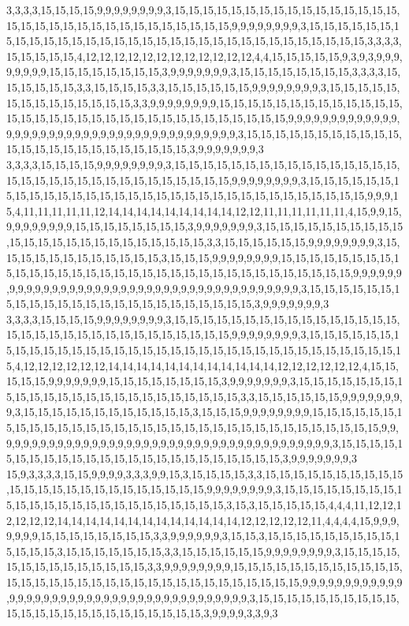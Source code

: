 3,3,3,3,15,15,15,15,9,9,9,9,9,9,9,9,3,15,15,15,15,15,15,15,15,15,15,15,15,15,15,15,15,15,15,15,15,15,15,15,15,15,15,15,15,15,15,15,15,9,9,9,9,9,9,9,9,3,15,15,15,15,15,15,15,15,15,15,15,15,15,15,15,15,15,15,15,15,15,15,15,15,15,15,15,15,15,15,15,15,3,3,3,3,15,15,15,15,15,4,12,12,12,12,12,12,12,12,12,12,12,12,4,4,15,15,15,15,15,9,3,9,3,9,9,9,9,9,9,9,9,15,15,15,15,15,15,15,15,3,9,9,9,9,9,9,9,3,15,15,15,15,15,15,15,15,3,3,3,3,15,15,15,15,15,15,3,3,15,15,15,15,3,3,15,15,15,15,15,15,9,9,9,9,9,9,9,9,3,15,15,15,15,15,15,15,15,15,15,15,15,15,15,3,3,9,9,9,9,9,9,9,9,15,15,15,15,15,15,15,15,15,15,15,15,15,15,15,15,15,15,15,15,15,15,15,15,15,15,15,15,15,15,15,15,15,9,9,9,9,9,9,9,9,9,9,9,9,9,9,9,9,9,9,9,9,9,9,9,9,9,9,9,9,9,9,9,9,9,9,9,9,9,9,9,9,3,15,15,15,15,15,15,15,15,15,15,15,15,15,15,15,15,15,15,15,15,15,15,15,15,3,9,9,9,9,9,9,9,3
3,3,3,3,15,15,15,15,9,9,9,9,9,9,9,9,3,15,15,15,15,15,15,15,15,15,15,15,15,15,15,15,15,15,15,15,15,15,15,15,15,15,15,15,15,15,15,15,15,9,9,9,9,9,9,9,9,3,15,15,15,15,15,15,15,15,15,15,15,15,15,15,15,15,15,15,15,15,15,15,15,15,15,15,15,15,15,15,15,15,9,9,9,15,4,11,11,11,11,11,12,14,14,14,14,14,14,14,14,14,12,12,11,11,11,11,11,11,4,15,9,9,15,9,9,9,9,9,9,9,9,15,15,15,15,15,15,15,15,3,9,9,9,9,9,9,9,3,15,15,15,15,15,15,15,15,15,15,15,15,15,15,15,15,15,15,15,15,15,15,15,15,3,3,15,15,15,15,15,15,9,9,9,9,9,9,9,9,3,15,15,15,15,15,15,15,15,15,15,15,15,3,15,15,15,9,9,9,9,9,9,9,9,15,15,15,15,15,15,15,15,15,15,15,15,15,15,15,15,15,15,15,15,15,15,15,15,15,15,15,15,15,15,15,15,15,9,9,9,9,9,9,9,9,9,9,9,9,9,9,9,9,9,9,9,9,9,9,9,9,9,9,9,9,9,9,9,9,9,9,9,9,9,9,9,9,3,15,15,15,15,15,15,15,15,15,15,15,15,15,15,15,15,15,15,15,15,15,15,15,15,3,9,9,9,9,9,9,9,3
3,3,3,3,15,15,15,15,9,9,9,9,9,9,9,9,3,15,15,15,15,15,15,15,15,15,15,15,15,15,15,15,15,15,15,15,15,15,15,15,15,15,15,15,15,15,15,15,15,9,9,9,9,9,9,9,9,3,15,15,15,15,15,15,15,15,15,15,15,15,15,15,15,15,15,15,15,15,15,15,15,15,15,15,15,15,15,15,15,15,15,15,15,4,12,12,12,12,12,12,14,14,14,14,14,14,14,14,14,14,14,14,12,12,12,12,12,12,4,15,15,15,15,15,9,9,9,9,9,9,9,15,15,15,15,15,15,15,15,3,9,9,9,9,9,9,9,3,15,15,15,15,15,15,15,15,15,15,15,15,15,15,15,15,15,15,15,15,15,15,15,15,3,3,15,15,15,15,15,15,9,9,9,9,9,9,9,9,3,15,15,15,15,15,15,15,15,15,15,15,15,3,15,15,15,9,9,9,9,9,9,9,9,15,15,15,15,15,15,15,15,15,15,15,15,15,15,15,15,15,15,15,15,15,15,15,15,15,15,15,15,15,15,15,15,15,9,9,9,9,9,9,9,9,9,9,9,9,9,9,9,9,9,9,9,9,9,9,9,9,9,9,9,9,9,9,9,9,9,9,9,9,9,9,9,9,3,15,15,15,15,15,15,15,15,15,15,15,15,15,15,15,15,15,15,15,15,15,15,15,15,3,9,9,9,9,9,9,9,3
15,9,3,3,3,3,15,15,9,9,9,9,3,3,3,9,9,15,3,15,15,15,15,3,3,15,15,15,15,15,15,15,15,15,15,15,15,15,15,15,15,15,15,15,15,15,15,15,15,9,9,9,9,9,9,9,9,3,15,15,15,15,15,15,15,15,15,15,15,15,15,15,15,15,15,15,15,15,15,15,15,15,3,15,3,15,15,15,15,15,4,4,4,11,12,12,12,12,12,12,14,14,14,14,14,14,14,14,14,14,14,14,14,12,12,12,12,12,11,4,4,4,4,15,9,9,9,9,9,9,9,15,15,15,15,15,15,15,15,3,3,9,9,9,9,9,9,3,15,15,3,15,15,15,15,15,15,15,15,15,15,15,15,15,3,15,15,15,15,15,15,15,3,3,15,15,15,15,15,15,9,9,9,9,9,9,9,9,3,15,15,15,15,15,15,15,15,15,15,15,15,15,15,3,3,9,9,9,9,9,9,9,9,15,15,15,15,15,15,15,15,15,15,15,15,15,15,15,15,15,15,15,15,15,15,15,15,15,15,15,15,15,15,15,15,15,9,9,9,9,9,9,9,9,9,9,9,9,9,9,9,9,9,9,9,9,9,9,9,9,9,9,9,9,9,9,9,9,9,9,9,9,9,9,9,9,3,15,15,15,15,15,15,15,15,15,15,15,15,15,15,15,15,15,15,15,15,15,15,15,15,3,9,9,9,9,3,3,9,3
